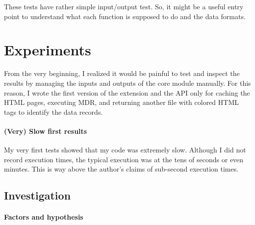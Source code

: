 \documentclass[10pt]{article}
\begin{document}
These tests have rather simple input/output test. So, it might be a useful entry point to understand what each function is supposed to do and the data formats. 



\section{Experiments}

From the very beginning, I realized it would be painful to test and inspect the results by managing the inputs and outputs of the core module manually. For this reason, I wrote the first version of the extension and the API only for caching the HTML pages, executing MDR, and returning another file with colored HTML tags to identify the data records.

\paragraph{(Very) Slow first results} 

My very first tests showed that my code was extremely slow. Although I did not record execution times, the typical execution was at the tens of seconds or even minutes. This is way above the author's claims of sub-second execution times.





\subsection{Investigation}

\paragraph{Factors and hypothesis}
\end{document}
